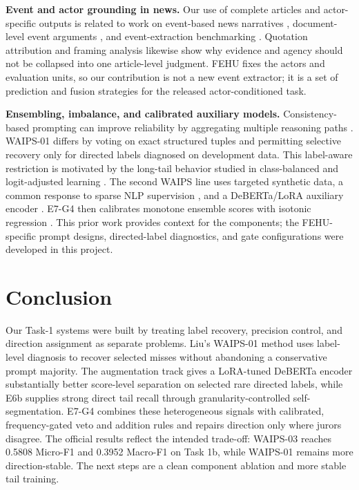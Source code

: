 \documentclass[sigconf,article,a4paper]{acmart}
\begin{document}
\textbf{Event and actor grounding in news.}
Our use of complete articles and actor-specific outputs is related to work on
event-based news narratives \cite{norambuena2023}, document-level event
arguments \cite{li2021}, and event-extraction benchmarking
\cite{huang2024}. Quotation attribution \cite{zhang2022} and framing analysis
\cite{tohidi2025} likewise show why evidence and agency should not be collapsed
into one article-level judgment. FEHU fixes the actors and evaluation units, so
our contribution is not a new event extractor; it is a set of prediction and
fusion strategies for the released actor-conditioned task.

\textbf{Ensembling, imbalance, and calibrated auxiliary models.}
Consistency-based prompting can improve reliability by aggregating multiple
reasoning paths \cite{wangSelfConsistency2023}. WAIPS-01 differs by voting on
exact structured tuples and permitting selective recovery only for directed
labels diagnosed on development data. This label-aware restriction is motivated
by the long-tail behavior studied in class-balanced and logit-adjusted learning
\cite{cui2019,menon2021}. The second WAIPS line uses targeted synthetic data, a
common response to sparse NLP supervision \cite{feng2021}, and a
DeBERTa/LoRA auxiliary encoder \cite{he2021,hu2022}. E7-G4 then calibrates
monotone ensemble scores with isotonic regression \cite{zadrozny2002}. This
prior work provides context for the components; the FEHU-specific prompt designs,
directed-label diagnostics, and gate configurations were developed in this
project.

\section{Conclusion}

Our Task-1 systems were built by treating label recovery, precision control,
and direction assignment as separate problems. Liu's WAIPS-01 method uses
label-level diagnosis to recover selected misses without abandoning a
conservative prompt majority. The augmentation track gives a LoRA-tuned
DeBERTa encoder substantially better score-level separation on selected rare
directed labels, while E6b supplies strong direct tail recall through
granularity-controlled self-segmentation. E7-G4 combines these heterogeneous
signals with calibrated, frequency-gated veto and addition rules and repairs
direction only where jurors disagree. The official results reflect the
intended trade-off: WAIPS-03 reaches 0.5808 Micro-F1 and 0.3952 Macro-F1 on
Task 1b, while WAIPS-01 remains more direction-stable. The next steps are a
clean component ablation and more stable tail training.
\end{document}
